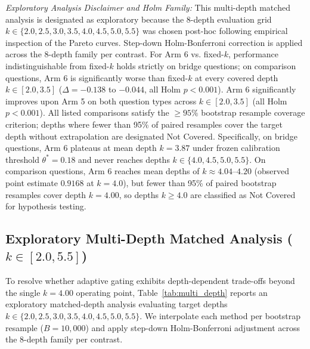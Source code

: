 \documentclass[conference]{IEEEtran}
\begin{document}
\begin{table}[t]
\begin{flushleft}
\footnotesize \textit{Exploratory Analysis Disclaimer and Holm Family:} This multi-depth matched analysis is designated as exploratory because the 8-depth evaluation grid $k \in \{2.0, 2.5, 3.0, 3.5, 4.0, 4.5, 5.0, 5.5\}$ was chosen post-hoc following empirical inspection of the Pareto curves. Step-down Holm-Bonferroni correction is applied across the 8-depth family per contrast. For Arm 6 vs. fixed-$k$, performance indistinguishable from fixed-$k$ holds strictly on bridge questions; on comparison questions, Arm 6 is significantly worse than fixed-$k$ at every covered depth $k \in [2.0, 3.5]$ ($\Delta = -0.138$ to $-0.044$, all Holm $p < 0.001$). Arm 6 significantly improves upon Arm 5 on both question types across $k \in [2.0, 3.5]$ (all Holm $p < 0.001$). All listed comparisons satisfy the $\ge 95\%$ bootstrap resample coverage criterion; depths where fewer than 95\% of paired resamples cover the target depth without extrapolation are designated Not Covered. Specifically, on bridge questions, Arm 6 plateaus at mean depth $k=3.87$ under frozen calibration threshold $\theta^*=0.18$ and never reaches depths $k \in \{4.0, 4.5, 5.0, 5.5\}$. On comparison questions, Arm 6 reaches mean depths of $k \approx 4.04\text{--}4.20$ (observed point estimate $0.9168$ at $k=4.0$), but fewer than 95\% of paired bootstrap resamples cover depth $k=4.00$, so depths $k \ge 4.0$ are classified as Not Covered for hypothesis testing.
\end{flushleft}
\end{table}

\subsection{Exploratory Multi-Depth Matched Analysis ($k \in [2.0, 5.5]$)}
To resolve whether adaptive gating exhibits depth-dependent trade-offs beyond the single $k=4.00$ operating point, Table~\ref{tab:multi_depth} reports an exploratory matched-depth analysis evaluating target depths $k \in \{2.0, 2.5, 3.0, 3.5, 4.0, 4.5, 5.0, 5.5\}$. We interpolate each method per bootstrap resample ($B=10{,}000$) and apply step-down Holm-Bonferroni adjustment across the 8-depth family per contrast.
\end{document}

